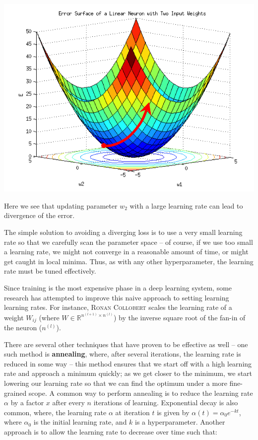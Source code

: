 \documentclass{tufte-handout}
\begin{document}
{\begin{marginfigure}%
  \includegraphics[width=\linewidth]{Error_Surf}
  \caption{Here we see that updating parameter $w_2$ with a large learning rate can lead to divergence of the error.}
  \label{fig:ErrorSurf}
\end{marginfigure}

The simple solution to avoiding a diverging loss is to use a very small learning rate so that we carefully scan the parameter space -- of course, if we use too small a learning rate, we might not converge in a reasonable amount of time, or might get caught in local minima.  Thus, as with any other hyperparameter, the learning rate must be tuned effectively.



Since training is the most expensive phase in a deep learning system, some research has attempted to improve this naive approach to setting learning learning rates. For instance, \textsc{Ronan Collobert} scales the learning rate of a weight $W_{ij}$  (where $W \in \mathbb{R}^{n^{(l+1)}\times n^{(l)}}$) by the inverse square root of the fan-in of the neuron ($n^{(l)}$). 

There are several other techniques that have proven to be effective as well -- one such method is \textbf{annealing}, where, after several iterations, the learning rate is reduced in some way -- this method ensures that we start off with a high learning rate and approach a minimum quickly; as we get closer to the minimum, we start lowering our learning rate so that we can find the optimum under a more fine-grained scope. A common way to perform annealing is to reduce the learning rate $\alpha$ by a factor $x$ after every $n$ iterations of learning. Exponential decay is also common, where, the learning rate $\alpha$ at iteration $t$ is given by $\alpha(t) = \alpha_0e^{-kt}$, where $\alpha_0$ is the initial learning rate, and $k$ is a hyperparameter. Another approach is to allow the learning rate to decrease over time such that:

}
\end{document}
